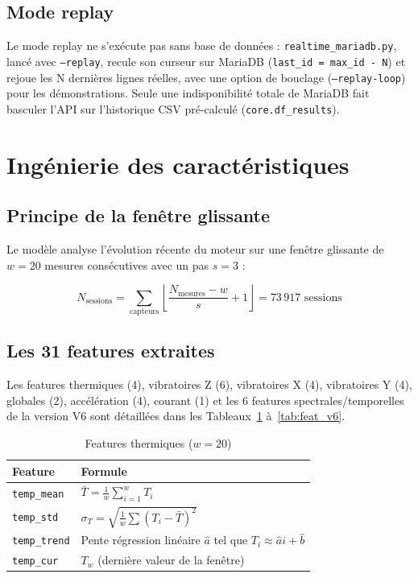 \documentclass[12pt,a4paper]{report}
\begin{document}
\subsection{Mode replay}

Le mode replay ne s'exécute pas sans base de données : \texttt{realtime\_mariadb.py},
lancé avec \texttt{--replay}, recule son curseur sur MariaDB
(\texttt{last\_id = max\_id - N}) et rejoue les N dernières lignes réelles, avec une
option de bouclage (\texttt{--replay-loop}) pour les démonstrations. Seule une
indisponibilité totale de MariaDB fait basculer l'API sur l'historique CSV pré-calculé
(\texttt{core.df\_results}).

\section{Ingénierie des caractéristiques}

\subsection{Principe de la fenêtre glissante}

Le modèle analyse l'évolution récente du moteur sur une fenêtre glissante de
$w = 20$ mesures consécutives avec un pas $s = 3$ :

\begin{equation}
  N_{\text{sessions}} = \sum_{\text{capteurs}} \left\lfloor \frac{N_{\text{mesures}} - w}{s} + 1 \right\rfloor = 73\,917 \text{ sessions}
\end{equation}

\subsection{Les 31 features extraites}

Les features thermiques (4), vibratoires Z (6), vibratoires X (4), vibratoires Y (4),
globales (2), accélération (4), courant (1) et les 6 features spectrales/temporelles
de la version V6 sont détaillées dans les Tableaux~\ref{tab:feat_temp} à~\ref{tab:feat_v6}.

\begin{table}[H]
\centering
\caption{Features thermiques ($w = 20$)}
\label{tab:feat_temp}
\begin{tabular}{ll}
\toprule
\textbf{Feature} & \textbf{Formule} \\
\midrule
\texttt{temp\_mean}  & $\bar{T} = \frac{1}{w}\sum_{i=1}^{w} T_i$ \\[4pt]
\texttt{temp\_std}   & $\sigma_T = \sqrt{\frac{1}{w}\sum (T_i - \bar{T})^2}$ \\[4pt]
\texttt{temp\_trend} & Pente régression linéaire $\hat{a}$ tel que $T_i \approx \hat{a}i + \hat{b}$ \\
\texttt{temp\_cur}   & $T_w$ (dernière valeur de la fenêtre) \\
\bottomrule
\end{tabular}
\end{table}
\end{document}
